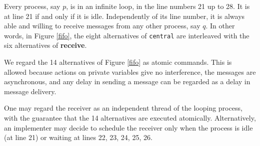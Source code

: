 \documentclass[10pt]{article} \usepackage[english]{babel}
\def\B #1/{\mbox {\textbf{#1}}}
\def\T #1/{\mbox {\texttt{#1}}}
\begin{document}
Every process, say $p$, is in an infinite loop, in the line numbers 21
up to 28. It is at line 21 if and only if it is idle. Independently of
its line number, it is always able and willing to receive messages
from any other process, say $q$.  In other words, in Figure
\ref{fifo}, the eight alternatives of \T central/ are interleaved with
the six alternatives of \B receive/.

We regard the 14 alternatives of Figure \ref{fifo} as atomic commands.
This is allowed because actions on private variables give no
interference, the messages are asynchronous, and any delay in sending
a message can be regarded as a delay in message delivery.

One may regard the receiver as an independent thread of the looping
process, with the guarantee that the 14 alternatives are executed
atomically.  Alternatively, an implementer may decide to schedule the
receiver only when the process is idle (at line 21) or waiting at
lines 22, 23, 24, 25, 26.
\end{document}
